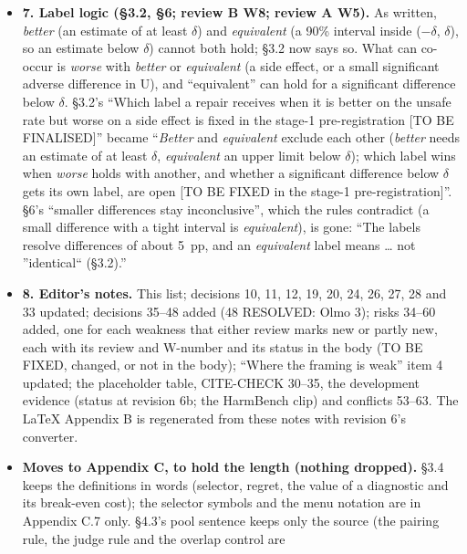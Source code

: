 \documentclass{article}
\theoremstyle{plain}
\theoremstyle{definition}
\theoremstyle{remark}
\begin{document}
\begin{itemize}
  \item \textbf{7. Label logic (\S{}3.2, \S{}6; review B W8; review A W5).} As
        written, \emph{better} (an estimate of at least $\delta$) and
        \emph{equivalent} (a 90\% interval inside ($-$$\delta$, $\delta$), so an
        estimate below $\delta$) cannot both hold; \S{}3.2 now says so. What can
        co-occur is \emph{worse} with \emph{better} or \emph{equivalent} (a side
        effect, or a small significant adverse difference in U), and
        ``equivalent'' can hold for a significant difference below $\delta$.
        \S{}3.2's ``Which label a repair receives when it is better on the
        unsafe rate but worse on a side effect is fixed in the stage-1
        pre-registration [TO BE FINALISED]'' became ``\emph{Better} and
        \emph{equivalent} exclude each other (\emph{better} needs an estimate of
        at least $\delta$, \emph{equivalent} an upper limit below $\delta$);
        which label wins when \emph{worse} holds with another, and whether a
        significant difference below $\delta$ gets its own label, are open [TO
        BE FIXED in the stage-1 pre-registration]''. \S{}6's ``smaller
        differences stay inconclusive'', which the rules contradict (a small
        difference with a tight interval is \emph{equivalent}), is gone: ``The
        labels resolve differences of about 5~pp, and an \emph{equivalent} label
        means \ldots{} not ''identical`` (\S{}3.2).''
  \item \textbf{8. Editor's notes.} This list; decisions 10, 11, 12, 19, 20, 24,
        26, 27, 28 and 33 updated; decisions 35--48 added (48 RESOLVED: Olmo 3);
        risks 34--60 added, one for each weakness that either review marks new
        or partly new, each with its review and W-number and its status in the
        body (TO BE FIXED, changed, or not in the body); ``Where the framing is
        weak'' item 4 updated; the placeholder table, CITE-CHECK 30--35, the
        development evidence (status at revision 6b; the HarmBench clip) and
        conflicts 53--63. The LaTeX Appendix B is regenerated from these notes
        with revision 6's converter.
  \item \textbf{Moves to Appendix C, to hold the length (nothing dropped).}
        \S{}3.4 keeps the definitions in words (selector, regret, the value of a
        diagnostic and its break-even cost); the selector symbols and the menu
        notation are in Appendix C.7 only. \S{}4.3's pool sentence keeps only
        the source (the pairing rule, the judge rule and the overlap control are
$$
\end{itemize}
\end{document}
